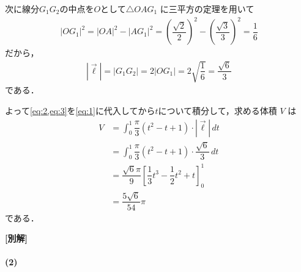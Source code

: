 \documentclass[../../main.tex]{subfiles}
\begin{document}
次に線分$G_1G_2$の中点を$O$として$\triangle OAG_1$ に三平方の定理を用いて
\begin{align}
  |OG_1|^2
  = |OA|^2-|AG_1|^2
  = \left(\dfrac{\sqrt{2}}{2}\right)^2 - \left(\dfrac{\sqrt{3}}{3}\right)^2
  = \dfrac{1}{6}
\end{align}
だから，
\begin{align}
  |\vec{\ell}| = |G_1 G_2| = 2|OG_1| = 2\sqrt{\dfrac{1}{6}} = \dfrac{\sqrt{6}}{3} \label{eq:3}
\end{align}
である．

よって\cref{eq:2,eq:3}を\cref{eq:1}に代入してから$t$について積分して，求める体積 $V$ は
\begin{align}
  V
  &= \int_0^1 \dfrac{\pi}{3}(t^2 - t + 1) \cdot |\vec{\ell}| \, dt \\
  &= \int_0^1 \dfrac{\pi}{3}(t^2 - t + 1) \cdot \dfrac{\sqrt{6}}{3} \, dt \\
  &= \dfrac{\sqrt{6}\pi}{9} \left[ \dfrac{1}{3}t^3 - \dfrac{1}{2}t^2 + t \right]_0^1 \\
  &= \dfrac{5\sqrt{6}}{54}\pi
\end{align}
である．

{\bf [別解]}

\paragraph{(2)}
\end{document}
